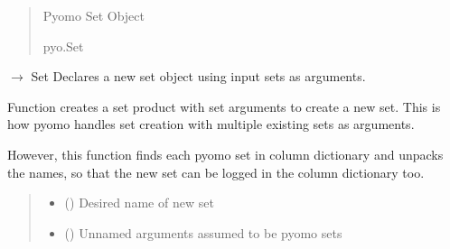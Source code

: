 \documentclass[letterpaper,10pt,english]{sphinxmanual}
\begin{document}
\begin{fulllineitems}
\begin{fulllineitems}
\begin{quote}
\begin{description}
\begin{itemize}
\end{itemize}

\sphinxAtStartPar
Pyomo Set Object

\sphinxAtStartPar
pyo.Set

\end{description}\end{quote}

\end{fulllineitems}


\begin{fulllineitems}
\label{\detokenize{src.common.model:src.common.model.Model.declare_set_with_sets}}
\pysigstartsignatures
\pysiglinewithargsret
{}
{\sphinxparamcomma {}\sphinxparamcomma {}\sphinxparamcomma {}}
{{ $\rightarrow$ Set}}
\pysigstopsignatures
\sphinxAtStartPar
Declares a new set object using input sets as arguments.

\sphinxAtStartPar
Function creates a set product with set arguments to create a new set. This is how pyomo
handles set creation with multiple existing sets as arguments.

\sphinxAtStartPar
However, this function finds each pyomo set in column dictionary and unpacks the names,
so that the new set can be logged in the column dictionary too.
\begin{quote}\begin{description}
\begin{itemize}
\item {} 
\sphinxAtStartPar
{} () \textendash{} Desired name of new set

\item {} 
\sphinxAtStartPar
{} () \textendash{} Unnamed arguments assumed to be pyomo sets


\end{itemize}
\end{description}
\end{quote}
\end{fulllineitems}
\end{fulllineitems}
\end{document}
